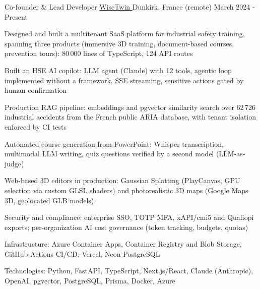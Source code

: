 


\begin{cventries}


\cventry
{Co-founder \& Lead Developer} %
{\href{https://www.wisetwin.eu}{WiseTwin {\tiny\textcolor{black}{\faExternalLink}}}} %
{Dunkirk, France (remote)} %
{March 2024 - Present} %
{ %
\begin{cvitems}
\item {Designed and built a multitenant SaaS platform for industrial safety training, spanning three products (immersive 3D training, document-based courses, prevention tours): 80\,000 lines of TypeScript, 124 API routes}
\item {Built an HSE AI copilot: LLM agent (Claude) with 12 tools, agentic loop implemented without a framework, SSE streaming, sensitive actions gated by human confirmation}
\item {Production RAG pipeline: embeddings and pgvector similarity search over 62\,726 industrial accidents from the French public ARIA database, with tenant isolation enforced by CI tests}
\item {Automated course generation from PowerPoint: Whisper transcription, multimodal LLM writing, quiz questions verified by a second model (LLM-as-judge)}
\item {Web-based 3D editors in production: Gaussian Splatting (PlayCanvas, GPU selection via custom GLSL shaders) and photorealistic 3D maps (Google Maps 3D, geolocated GLB models)}
\item {Security and compliance: enterprise SSO, TOTP MFA, xAPI/cmi5 and Qualiopi exports; per-organization AI cost governance (token tracking, budgets, quotas)}
\item {Infrastructure: Azure Container Apps, Container Registry and Blob Storage, GitHub Actions CI/CD, Vercel, Neon PostgreSQL}
\item {Technologies: Python, FastAPI, TypeScript, Next.js/React, Claude (Anthropic), OpenAI, pgvector, PostgreSQL, Prisma, Docker, Azure}
\end{cvitems}
}


\end{cventries}
